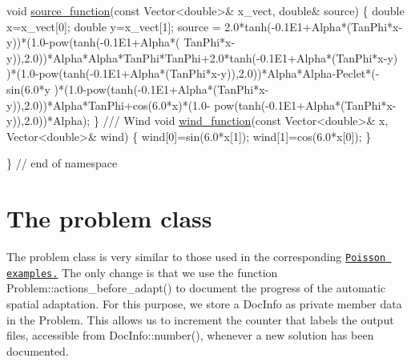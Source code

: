\begin{DoxyCodeInclude}
\textcolor{comment}{} \textcolor{keywordtype}{void} \hyperlink{namespaceTanhSolnForAdvectionDiffusion_aaa1aa95713b02b211812fdd18eeaa369}{source\_function}(\textcolor{keyword}{const} Vector<double>& x\_vect, \textcolor{keywordtype}{double}& source)
 \{
  \textcolor{keywordtype}{double} x=x\_vect[0];
  \textcolor{keywordtype}{double} y=x\_vect[1];
  source = 
2.0*tanh(-0.1E1+Alpha*(TanPhi*x-y))*(1.0-pow(tanh(-0.1E1+Alpha*(
TanPhi*x-y)),2.0))*Alpha*Alpha*TanPhi*TanPhi+2.0*tanh(-0.1E1+Alpha*(TanPhi*x-y)
)*(1.0-pow(tanh(-0.1E1+Alpha*(TanPhi*x-y)),2.0))*Alpha*Alpha-Peclet*(-sin(6.0*y
)*(1.0-pow(tanh(-0.1E1+Alpha*(TanPhi*x-y)),2.0))*Alpha*TanPhi+cos(6.0*x)*(1.0-
pow(tanh(-0.1E1+Alpha*(TanPhi*x-y)),2.0))*Alpha);
 \}
\textcolor{comment}{}
\textcolor{comment}{ /// Wind}
\textcolor{comment}{} \textcolor{keywordtype}{void} \hyperlink{namespaceTanhSolnForAdvectionDiffusion_ab40e93031d34986762c69616c3c8b065}{wind\_function}(\textcolor{keyword}{const} Vector<double>& x, Vector<double>& wind)
 \{
  wind[0]=sin(6.0*x[1]);
  wind[1]=cos(6.0*x[0]);
 \}
 
\} \textcolor{comment}{// end of namespace}

\end{DoxyCodeInclude}




 

\hypertarget{index_problem}{}\section{The problem class}\label{index_problem}
The problem class is very similar to those used in the corresponding \href{../../../poisson/two_d_poisson/html/index.html#problem}{\tt Poisson examples.} The only change is that we use the function {\ttfamily Problem\+::actions\+\_\+before\+\_\+adapt()} to document the progress of the automatic spatial adaptation. For this purpose, we store a {\ttfamily Doc\+Info} as private member data in the {\ttfamily Problem}. This allows us to increment the counter that labels the output files, accessible from {\ttfamily Doc\+Info\+::number()}, whenever a new solution has been documented.

